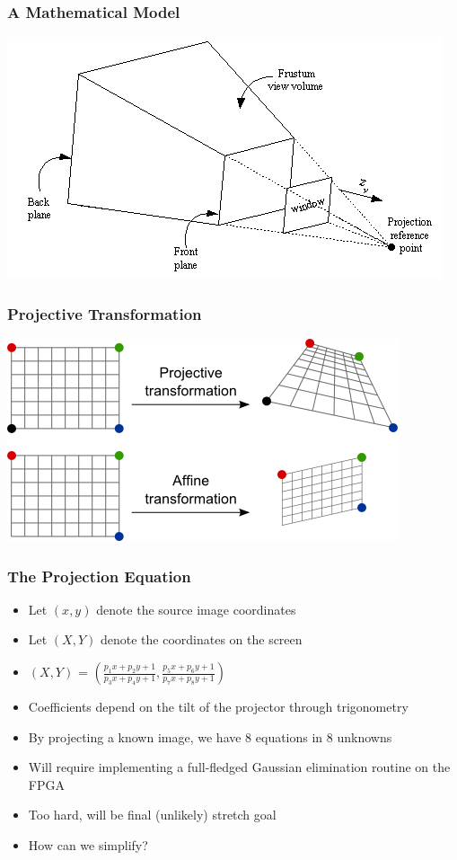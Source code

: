 \documentclass{beamer}
\begin{document}
\begin{frame}
\frametitle{A Mathematical Model}
\includegraphics[height=0.5\textheight]{./img/projective_frustrum}
\end{frame}

\begin{frame}
\frametitle{Projective Transformation}
\includegraphics[height=0.5\textheight]{./img/projective_transform}
\end{frame}

\begin{frame}
\frametitle{The Projection Equation}
\begin{itemize}
\item Let $(x, y)$ denote the source image coordinates
\item Let $(X, Y)$ denote the coordinates on the screen
\item $(X, Y)$ = $\left( \frac{p_1x + p_2y + 1}{p_3x + p_4y + 1}, \frac{p_5x + p_6y + 1}{p_7x + p_8y + 1} \right)$
\item Coefficients depend on the tilt of the projector through trigonometry
\pause
\item By projecting a known image, we have 8 equations in 8 unknowns
\item Will require implementing a full-fledged Gaussian elimination routine on the FPGA
\item Too hard, will be final (unlikely) stretch goal
\item How can we simplify?
\end{itemize}
\end{frame}
\end{document}
